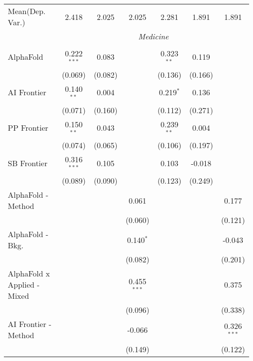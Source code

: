 \begin{tabular}{lcccccc}
Mean(Dep. Var.) & 2.418 & 2.025 & 2.025 & 2.281 & 1.891 & 1.891 \\
 & \multicolumn{6}{c}{\textit{Medicine}} \\ \\
   AlphaFold                     & 0.222$^{***}$ & 0.083   &                & 0.323$^{**}$ & 0.119   &   \\   
                                 & (0.069)       & (0.082) &                & (0.136)      & (0.166) &   \\   
   AI Frontier                   & 0.140$^{**}$  & 0.004   &                & 0.219$^{*}$  & 0.136   &   \\   
                                 & (0.071)       & (0.160) &                & (0.112)      & (0.271) &   \\   
   PP Frontier                   & 0.150$^{**}$  & 0.043   &                & 0.239$^{**}$ & 0.004   &   \\   
                                 & (0.074)       & (0.065) &                & (0.106)      & (0.197) &   \\   
   SB Frontier                   & 0.316$^{***}$ & 0.105   &                & 0.103        & -0.018  &   \\   
                                 & (0.089)       & (0.090) &                & (0.123)      & (0.249) &   \\   
   AlphaFold - Method            &               &         & 0.061          &              &         & 0.177\\   
                                 &               &         & (0.060)        &              &         & (0.121)\\   
   AlphaFold - Bkg.              &               &         & 0.140$^{*}$    &              &         & -0.043\\   
                                 &               &         & (0.082)        &              &         & (0.201)\\   
   AlphaFold x Applied - Mixed   &               &         & 0.455$^{***}$  &              &         & 0.375\\   
                                 &               &         & (0.096)        &              &         & (0.338)\\   
   AI Frontier - Method          &               &         & -0.066         &              &         & 0.326$^{***}$\\   
                                 &               &         & (0.149)        &              &         & (0.122)\\   

\end{tabular}
